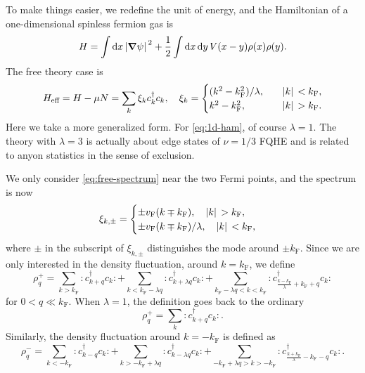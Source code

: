 \documentclass[hyperref, a4paper]{article}
\newcommand*{\normalorder}[1]{: #1 :}
\begin{document}
To make things easier, we redefine the unit of energy, and the Hamiltonian of a one-dimensional spinless fermion gas is 
\begin{equation}
    H = \int \dd{x} \abs*{\grad{\psi}}^2 + \frac{1}{2} \int \dd{x} \dd{y} V(x - y) \rho(x) \rho(y). 
    \label{eq:1d-ham}
\end{equation}
The free theory case is 
\begin{equation}
    H_\text{eff} = H - \mu N = \sum_k \xi_k c^\dagger_k c_k, \quad \xi_k = \begin{cases}
        (k^2 - k_\text{F}^2) / \lambda, \quad &\abs*{k} < k_\text{F}, \\
        k^2 - k_\text{F}^2, \quad &\abs*{k} > k_\text{F}.
    \end{cases}
    \label{eq:free-spectrum}
\end{equation}
Here we take a more generalized form. For \eqref{eq:1d-ham}, of course $\lambda = 1$. 
The theory with $\lambda = 3$ is actually about edge states of $\nu = 1 /3$ FQHE and is related to anyon statistics in the sense of exclusion. %

We only consider \eqref{eq:free-spectrum} near the two Fermi points, and the spectrum is now 
\begin{equation}
    \xi_{k, \pm} = \begin{cases}
        \pm v_\text{F} (k \mp k_\text{F}), \quad \abs*{k} > k_\text{F}, \\
        \pm v_\text{F} (k \mp k_\text{F}) / \lambda, \quad \abs*{k} < k_\text{F},
    \end{cases}
\end{equation}
where $\pm$ in the subscript of $\xi_{k, \pm}$ distinguishes the mode around $\pm k_\text{F}$.
Since we are only interested in the density fluctuation, around $k = k_\text{F}$, we define 
\begin{equation}
    \rho^+_q = \sum_{k > k_\text{F}} \normalorder{c^\dagger_{k+q} c_k} 
    + \sum_{k < k_\text{F} - \lambda q} \normalorder{c^\dagger_{k + \lambda q} c_k} 
    + \sum_{k_\text{F} - \lambda q < k < k_\text{F} } \normalorder{c^\dagger_{\frac{k - k_\text{F}}{\lambda}  + k_\text{F} +q} c_k} 
\end{equation}
for $0 <q \ll k_\text{F}$. When $\lambda = 1$, the definition goes back to the ordinary 
\begin{equation}
    \rho^+_q = \sum_k \normalorder{c^\dagger_{k+q} c_k}.
\end{equation}
Similarly, the density fluctuation around $k = - k_\text{F}$ is defined as 
\begin{equation}
    \rho^-_q = \sum_{k < -k_\text{F}} \normalorder{c^\dagger_{k-q} c_k} 
    + \sum_{k > - k_\text{F} + \lambda q} \normalorder{c^\dagger_{k - \lambda q} c_k} 
    + \sum_{- k_\text{F} + \lambda q > k > - k_\text{F} } \normalorder{c^\dagger_{\frac{k + k_\text{F}}{\lambda} - k_\text{F} - q} c_k} .
\end{equation}
\end{document}
